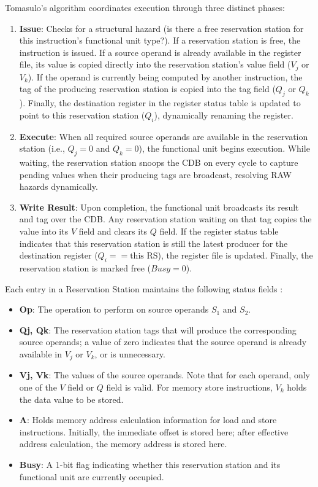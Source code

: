 Tomasulo's algorithm coordinates execution through three distinct phases:
\begin{enumerate}
    \item \textbf{Issue}: Checks for a structural hazard (is there a free reservation station for this instruction's functional unit type?). If a reservation station is free, the instruction is issued. If a source operand is already available in the register file, its value is copied directly into the reservation station's value field ($V_j$ or $V_k$). If the operand is currently being computed by another instruction, the tag of the producing reservation station is copied into the tag field ($Q_j$ or $Q_k$). Finally, the destination register in the register status table is updated to point to this reservation station ($Q_i$), dynamically renaming the register.
    
    \item \textbf{Execute}: When all required source operands are available in the reservation station (i.e., $Q_j = 0$ and $Q_k = 0$), the functional unit begins execution. While waiting, the reservation station snoops the CDB on every cycle to capture pending values when their producing tags are broadcast, resolving RAW hazards dynamically.
    
    \item \textbf{Write Result}: Upon completion, the functional unit broadcasts its result and tag over the CDB. Any reservation station waiting on that tag copies the value into its $V$ field and clears its $Q$ field. If the register status table indicates that this reservation station is still the latest producer for the destination register ($Q_i == \text{this RS}$), the register file is updated. Finally, the reservation station is marked free ($Busy = 0$).
\end{enumerate}

Each entry in a Reservation Station maintains the following status fields \cite{Patterson19}:
\begin{itemize}
    \item \textbf{Op}: The operation to perform on source operands $S_1$ and $S_2$.
    \item \textbf{Qj, Qk}: The reservation station tags that will produce the corresponding source operands; a value of zero indicates that the source operand is already available in $V_j$ or $V_k$, or is unnecessary.
    \item \textbf{Vj, Vk}: The values of the source operands. Note that for each operand, only one of the $V$ field or $Q$ field is valid. For memory store instructions, $V_k$ holds the data value to be stored.
    \item \textbf{A}: Holds memory address calculation information for load and store instructions. Initially, the immediate offset is stored here; after effective address calculation, the memory address is stored here.
    \item \textbf{Busy}: A 1-bit flag indicating whether this reservation station and its functional unit are currently occupied.
\end{itemize}


